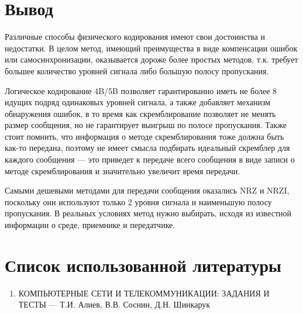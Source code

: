 \section{Вывод}
Различные способы физического кодирования имеют свои достоинства и недостатки.
В целом метод, имеющий преимущества в виде компенсации ошибок или самосинхронизации,
оказывается дороже более простых методов, т.к. требует большее количество уровней
сигнала либо большую полосу пропускания.

Логическое кодирование 4B/5B позволяет гарантированно иметь не более 8 идущих подряд одинаковых уровней сигнала,
а также добавляет механизм обнаружения ошибок,
в то время как скремблирование позволяет не менять размер сообщения, но не гарантирует выигрыш по полосе пропускания.
Также стоит помнить, что информация о методе скремблирования тоже должна быть как-то передана,
поэтому не имеет смысла подбирать идеальный скремблер для каждого сообщения --- это приведет к передаче
всего сообщения в виде записи о методе скремблирования и значительно увеличит время передачи.

Самыми дешевыми методами для передачи сообщения оказались NRZ и NRZI,
поскольку они используют только 2 уровня сигнала и наименьшую полосу пропускания.
В реальных условиях метод нужно выбирать, исходя из известной информации о среде,
приемнике и передатчике.

\section{Список использованной литературы}
\begin{enumerate}
    \item КОМПЬЮТЕРНЫЕ СЕТИ И ТЕЛЕКОММУНИКАЦИИ: ЗАДАНИЯ И ТЕСТЫ --- Т.И. Алиев, В.В. Соснин, Д.Н. Шинкарук
\end{enumerate}
